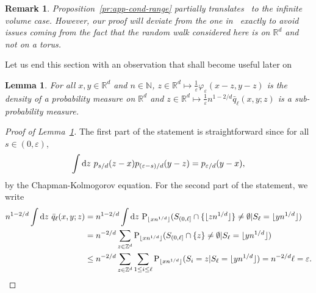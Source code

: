 \documentclass[a4paper,11pt]{amsart}
\numberwithin{equation}{section}
\newtheorem{lemma}[theorem]{Lemma}
\newtheorem{remark}[theorem]{Remark}
\newcommand{\bbN}{{\ensuremath{\mathbb N}} }
\newcommand{\bbR}{{\ensuremath{\mathbb R}} }
\newcommand{\bbZ}{{\ensuremath{\mathbb Z}} }
\newcommand{\gep}{\varepsilon}
\newcommand{\dd}{\text{\rm d}}             %
\newcommand{\R}{\mathbb{R}}
\newcommand\bP{\ensuremath{\mathrm{P}}}
\newcommand{\8}{\infty}
\newcommand{\beq}{\begin{equation}}
\newcommand{\eeq}{\end{equation}}
\newcommand{\ba}{\begin{aligned}}
\newcommand{\ea}{\end{aligned}}
\begin{document}
\begin{remark}
Proposition~\ref{pr:app-cond-range} partially translates~\cite[Lemma 2.2.10 (a)]{Phetpradap} to the infinite volume case. However, our proof will deviate from the one in~\cite{Phetpradap} exactly to avoid issues coming from the fact that the random walk considered here is on $\R^d$ and not on a torus.
\end{remark}
%
Let us end this section with an observation that shall become useful later on
\begin{lemma}
\label{lem:phi.q.prob}
For all $x,y\in\bbR^d$ and $n\in\bbN$, $z\in\bbR^d\mapsto \frac1\gep \varphi_\gep(x-z,y-z)$ is the density of a probability measure on $\bbR^d$ and $z\in\bbR^d \mapsto \frac 1\gep n^{1-2/d} \bar q_\ell(x,y;z)$ is a sub-probability measure.
\end{lemma}
%
\begin{proof}[Proof of Lemma~\ref{lem:phi.q.prob}]
The first part of the statement is straightforward since for all $s\in (0,\gep)$,
\beq
\label{eq:phi.q.prob}
\int \dd z\ p_{s/d}(z-x) p_{(\gep-s)/d}(y-z) = p_{\gep/d}(y-x),
\eeq
by the Chapman-Kolmogorov equation. For the second part of the statement, we write
\beq
\ba
n^{1-2/d}\int \dd z\ \bar q_\ell(x,y;z) 
&= n^{1-2/d}\int \dd z\ 
\bP_{\lfloor x n^{1/d}\rfloor}(S_{(0,\ell]}\cap \{\lfloor z n^{1/d}\rfloor\}\neq \emptyset | S_\ell = \lfloor yn^{1/d}\rfloor)\\
&= n^{-2/d} \sum_{z\in\bbZ^d}
\bP_{\lfloor x n^{1/d}\rfloor}(S_{(0,\ell]}\cap \{z\}\neq \emptyset | S_\ell = \lfloor yn^{1/d}\rfloor)\\
&\le n^{-2/d} \sum_{z\in\bbZ^d} \sum_{1\le i \le \ell} \bP_{\lfloor x n^{1/d}\rfloor}(S_i = z | S_\ell = \lfloor yn^{1/d}\rfloor) = n^{-2/d} \ell = \gep.
\ea
\eeq
\end{proof}
%
%
\end{document}
